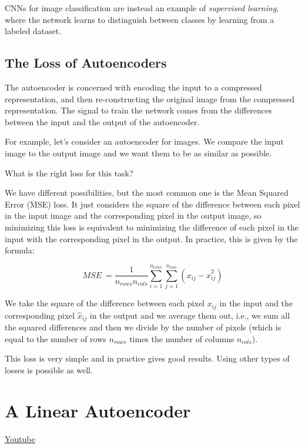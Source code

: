 CNNs for image classification are instead an example of \textit{supervised learning}, where the network learns to distinguish between classes by learning from a labeled dataset.

\subsection{The Loss of Autoencoders}

The autoencoder is concerned with encoding the input to a compressed representation, and then re-constructing the original image from the compressed representation. The signal to train the network comes from the differences between the input and the output of the autoencoder. \newline

For example, let's consider an autoencoder for images. We compare the input image to the output image and we want them to be as similar as possible. \newline

What is the right loss for this task? \newline

We have different possibilities, but the most common one is the Mean Squared Error (MSE) loss. It just considers the square of the difference between each pixel in the input image and the corresponding pixel in the output image, so minimizing this loss is equivalent to minimizing the difference of each pixel in the input with the corresponding pixel in the output. In practice, this is given by the formula: 

\[MSE\ = \frac{1}{n_{rows} n_{cols}} \sum_{i=1}^{n_{rows}} \sum_{j=1}^{n_{cols}} (x_{ij} - \hat{x}_{ij}^2)\]

We take the square of the difference between each pixel \(x_{ij}\) in the input and the corresponding pixel \(\hat{x}_{ij}\) in the output and we average them out, i.e., we sum all the squared differences and then we divide by the number of pixels (which is equal to the number of rows \(n_{rows}\) times the number of columns \(n_{cols}\)). \newline

This loss is very simple and in practice gives good results. Using other types of losses is possible as well.

\section{A Linear Autoencoder}
\href{https://www.youtube.com/watch?v=Wo6TRsHNJEY&t=2s&ab_channel=Udacity}{Youtube} \newline

